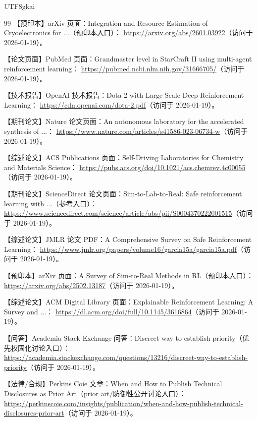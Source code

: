 \documentclass[12pt]{article}
\begin{document}
\begin{CJK*}{UTF8}{gkai}
\begin{thebibliography}{99}
【预印本】arXiv 页面：Integration and Resource Estimation of Cryoelectronics for ...（预印本入口）：
\url{https://arxiv.org/abs/2601.03922}（访问于 2026-01-19）。

【论文页面】PubMed 页面：Grandmaster level in StarCraft II using multi-agent reinforcement learning：
\url{https://pubmed.ncbi.nlm.nih.gov/31666705/}（访问于 2026-01-19）。

【技术报告】OpenAI 技术报告：Dota 2 with Large Scale Deep Reinforcement Learning：
\url{https://cdn.openai.com/dota-2.pdf}（访问于 2026-01-19）。

【期刊论文】Nature 论文页面：An autonomous laboratory for the accelerated synthesis of ...：
\url{https://www.nature.com/articles/s41586-023-06734-w}（访问于 2026-01-19）。

【综述论文】ACS Publications 页面：Self-Driving Laboratories for Chemistry and Materials Science：
\url{https://pubs.acs.org/doi/10.1021/acs.chemrev.4c00055}（访问于 2026-01-19）。

【期刊论文】ScienceDirect 论文页面：Sim-to-Lab-to-Real: Safe reinforcement learning with ...（参考入口）：
\url{https://www.sciencedirect.com/science/article/abs/pii/S0004370222001515}（访问于 2026-01-19）。

【综述论文】JMLR 论文 PDF：A Comprehensive Survey on Safe Reinforcement Learning：
\url{https://www.jmlr.org/papers/volume16/garcia15a/garcia15a.pdf}（访问于 2026-01-19）。

【预印本】arXiv 页面：A Survey of Sim-to-Real Methods in RL（预印本入口）：
\url{https://arxiv.org/abs/2502.13187}（访问于 2026-01-19）。

【综述论文】ACM Digital Library 页面：Explainable Reinforcement Learning: A Survey and ...：
\url{https://dl.acm.org/doi/full/10.1145/3616864}（访问于 2026-01-19）。

【问答】Academia Stack Exchange 问答：Discreet way to establish priority（优先权固化讨论入口）：
\url{https://academia.stackexchange.com/questions/13216/discreet-way-to-establish-priority}（访问于 2026-01-19）。

【法律/合规】Perkins Coie 文章：When and How to Publish Technical Disclosures as Prior Art（prior art/防御性公开讨论入口）：
\url{https://perkinscoie.com/insights/publication/when-and-how-publish-technical-disclosures-prior-art}（访问于 2026-01-19）。


\end{thebibliography}
\end{CJK*}
\end{document}
